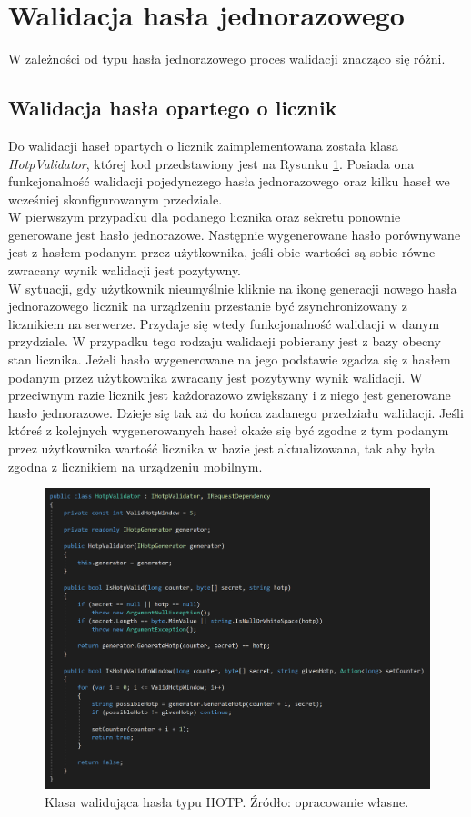 \section{Walidacja hasła jednorazowego}
W zależności od typu hasła jednorazowego proces walidacji znacząco się różni.

\subsection{Walidacja hasła opartego o licznik}
Do walidacji haseł opartych o licznik zaimplementowana została klasa \textit{HotpValidator}, której kod przedstawiony jest 
na Rysunku \ref{hotp-validator}. Posiada ona funkcjonalność walidacji pojedynczego hasła jednorazowego 
oraz kilku haseł we wcześniej skonfigurowanym przedziale. \\
W pierwszym przypadku dla podanego licznika oraz sekretu ponownie generowane jest hasło jednorazowe.
Następnie wygenerowane hasło porównywane jest z hasłem podanym przez użytkownika, jeśli obie wartości są sobie równe
zwracany wynik walidacji jest pozytywny. \\
W sytuacji, gdy użytkownik nieumyślnie kliknie na ikonę generacji nowego hasła jednorazowego 
licznik na urządzeniu przestanie być zsynchronizowany z licznikiem na serwerze. 
Przydaje się wtedy funkcjonalność walidacji w danym przydziale. 
W przypadku tego rodzaju walidacji pobierany jest z bazy obecny stan licznika. 
Jeżeli hasło wygenerowane na jego podstawie zgadza się z hasłem podanym przez użytkownika zwracany jest 
pozytywny wynik walidacji. 
W przeciwnym razie licznik jest każdorazowo zwiększany i z niego jest generowane hasło jednorazowe. 
Dzieje się tak aż do końca zadanego przedziału walidacji. 
Jeśli któreś z kolejnych wygenerowanych haseł okaże się być zgodne z tym podanym przez użytkownika 
wartość licznika w bazie jest aktualizowana, tak aby była zgodna z licznikiem na urządzeniu mobilnym.
\begin{figure}[t]
    \centering
	\includegraphics[width=\textwidth]{content/images/code-hvalidator}
    \caption{Klasa walidująca hasła typu HOTP. Źródło: opracowanie własne.}
    \label{hotp-validator}
\end{figure} 


